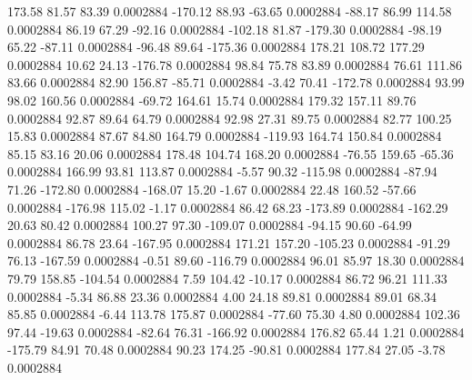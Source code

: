       173.58       81.57       83.39     0.0002884
     -170.12       88.93      -63.65     0.0002884
      -88.17       86.99      114.58     0.0002884
       86.19       67.29      -92.16     0.0002884
     -102.18       81.87     -179.30     0.0002884
      -98.19       65.22      -87.11     0.0002884
      -96.48       89.64     -175.36     0.0002884
      178.21      108.72      177.29     0.0002884
       10.62       24.13     -176.78     0.0002884
       98.84       75.78       83.89     0.0002884
       76.61      111.86       83.66     0.0002884
       82.90      156.87      -85.71     0.0002884
       -3.42       70.41     -172.78     0.0002884
       93.99       98.02      160.56     0.0002884
      -69.72      164.61       15.74     0.0002884
      179.32      157.11       89.76     0.0002884
       92.87       89.64       64.79     0.0002884
       92.98       27.31       89.75     0.0002884
       82.77      100.25       15.83     0.0002884
       87.67       84.80      164.79     0.0002884
     -119.93      164.74      150.84     0.0002884
       85.15       83.16       20.06     0.0002884
      178.48      104.74      168.20     0.0002884
      -76.55      159.65      -65.36     0.0002884
      166.99       93.81      113.87     0.0002884
       -5.57       90.32     -115.98     0.0002884
      -87.94       71.26     -172.80     0.0002884
     -168.07       15.20       -1.67     0.0002884
       22.48      160.52      -57.66     0.0002884
     -176.98      115.02       -1.17     0.0002884
       86.42       68.23     -173.89     0.0002884
     -162.29       20.63       80.42     0.0002884
      100.27       97.30     -109.07     0.0002884
      -94.15       90.60      -64.99     0.0002884
       86.78       23.64     -167.95     0.0002884
      171.21      157.20     -105.23     0.0002884
      -91.29       76.13     -167.59     0.0002884
       -0.51       89.60     -116.79     0.0002884
       96.01       85.97       18.30     0.0002884
       79.79      158.85     -104.54     0.0002884
        7.59      104.42      -10.17     0.0002884
       86.72       96.21      111.33     0.0002884
       -5.34       86.88       23.36     0.0002884
        4.00       24.18       89.81     0.0002884
       89.01       68.34       85.85     0.0002884
       -6.44      113.78      175.87     0.0002884
      -77.60       75.30        4.80     0.0002884
      102.36       97.44      -19.63     0.0002884
      -82.64       76.31     -166.92     0.0002884
      176.82       65.44        1.21     0.0002884
     -175.79       84.91       70.48     0.0002884
       90.23      174.25      -90.81     0.0002884
      177.84       27.05       -3.78     0.0002884
